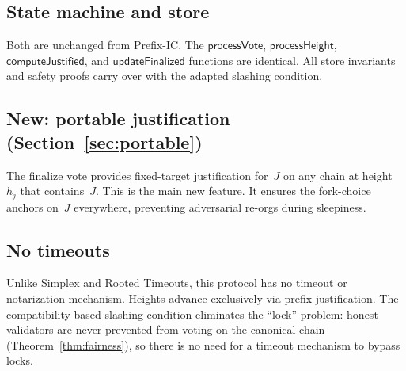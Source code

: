 \documentclass{article}
\theoremstyle{plain}
\theoremstyle{definition}
\theoremstyle{remark}
\begin{document}
\subsection*{State machine and store}

Both are unchanged from Prefix-IC.
The $\textsf{processVote}$, $\textsf{processHeight}$, $\textsf{computeJustified}$, and $\textsf{updateFinalized}$ functions are identical.
All store invariants and safety proofs carry over with the adapted slashing condition.

\subsection*{New: portable justification (Section~\ref{sec:portable})}

The finalize vote provides fixed-target justification for~$J$ on any chain at height~$h_j$ that contains~$J$.
This is the main new feature.
It ensures the fork-choice anchors on~$J$ everywhere, preventing adversarial re-orgs during sleepiness.

\subsection*{No timeouts}

Unlike Simplex and Rooted Timeouts, this protocol has no timeout or notarization mechanism.
Heights advance exclusively via prefix justification.
The compatibility-based slashing condition eliminates the ``lock'' problem: honest validators are never prevented from voting on the canonical chain (Theorem~\ref{thm:fairness}), so there is no need for a timeout mechanism to bypass locks.
\end{document}
